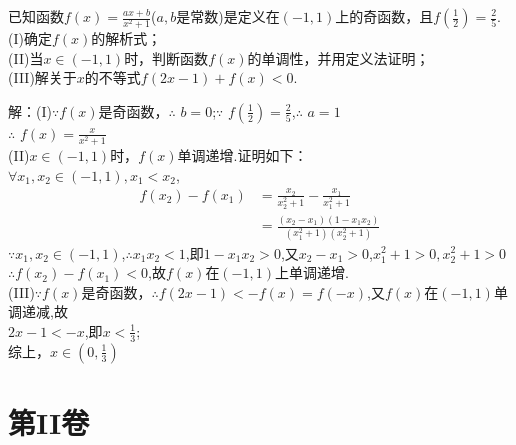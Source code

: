 \begin{exercise}
已知函数$f(x)=\frac{ax+b}{x^2+1}$($a,b$是常数)是定义在$(-1,1)$上的奇函数，且$f(\frac{1}2)=\frac{2}5$.\\
(I)确定$f(x)$的解析式；\\
(II)当$x\in(-1,1)$时，判断函数$f(x)$的单调性，并用定义法证明；\\
(III)解关于$x$的不等式$f(2x-1)+f(x)<0$.\\
\begin{answer}
  解：(I)$\because$$f(x)$是奇函数，$\therefore$ $b=0$;$\because$ $f(\frac12)=\frac25$,$\therefore$ $a=1$\\
  $\therefore$ $f(x)=\frac{x}{x^2+1}$\\
  (II)$x\in(-1,1)$时，$f(x)$单调递增.证明如下：\\
  $\forall x_1,x_2\in(-1,1),x_1<x_2$,\\
  \begin{equation*}
    \begin{align*}
      f(x_2)-f(x_1)
      &=\frac{x_2}{x_2^2+1}-\frac{x_1}{x_1^2+1}\\
      &=\frac{(x_2-x_1)(1-x_1x_2)}{(x_1^2+1)(x_2^2+1)}
    \end{align*}
  \end{equation*}
   $\because x_1,x_2\in(-1,1)$,$\therefore x_1x_2<1$,即$1-x_1x_2>0$,又$x_2-x_1>0$,$x_1^2+1>0,x_2^2+1>0$\\
  $\therefore f(x_2)-f(x_1)<0$,故$f(x)$在$(-1,1)$上单调递增.\\
  (III)$\because f(x)$是奇函数，$\therefore f(2x-1)<-f(x)=f(-x)$,又$f(x)$在$(-1,1)$单调递减,故\\
  $2x-1<-x$,即$x<\frac13$;\\
  综上，$x\in (0,\frac13)$
\end{answer}
\vspace{-2em}
\part{第II卷}
\vspace{-1.5em}

\end{exercise}

